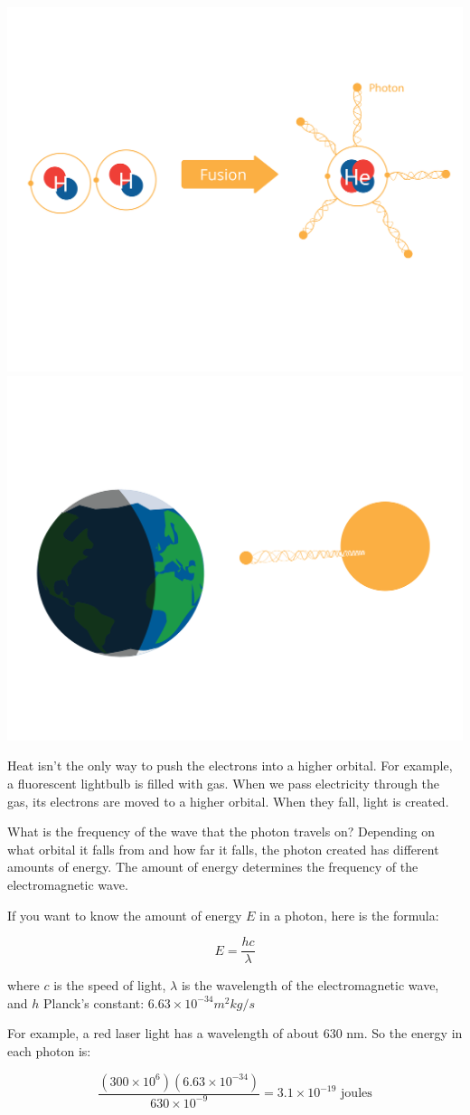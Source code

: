 \includegraphics[width=.5\textwidth]{cow2.png}
\includegraphics[width=.5\textwidth]{cow3.png}



Heat isn't the only way to push the electrons into a higher
orbital. For example, a fluorescent lightbulb is filled with gas.
When we pass electricity through the gas, its electrons are moved to a
higher orbital.  When they fall, light is created.



What is the frequency of the wave that the photon travels on?
Depending on what orbital it falls from and how far it falls, the
photon created has different amounts of energy. The amount of energy
determines the frequency of the electromagnetic wave.

\begin{mdframed}[style=important, frametitle={Formula for enegy of a photon}]

If you want to know the amount of energy $E$ in a photon, here is the formula:

$$E = \frac{h c}{\lambda}$$

where $c$ is the speed of light, $\lambda$ is the wavelength of the
electromagnetic wave, and $h$ Planck's constant: $6.63 \times 10^{-34} m^2 kg/s$

For example, a red laser light has a wavelength of about 630 nm. So the energy in each photon is:

$$\frac{(300 \times 10^6) (6.63 \times 10^{-34})}{630 \times 10^{-9}} = 3.1 \times 10^{-19} \text{ joules}$$

\end{mdframed}

